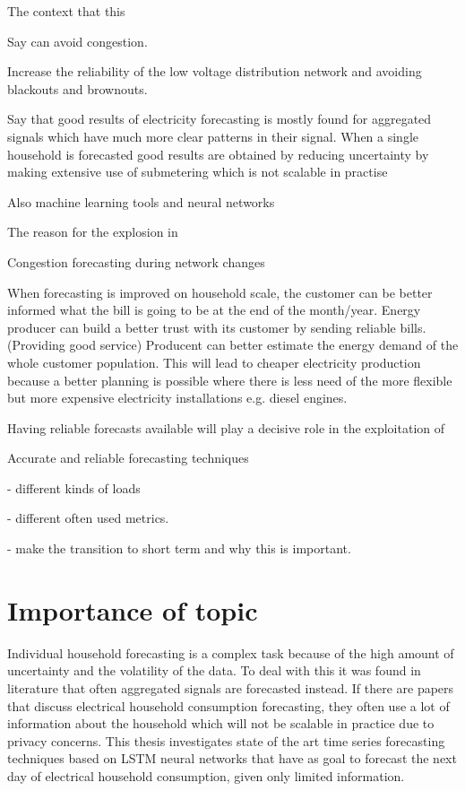 The context that this 


Say can avoid congestion. 

Increase the reliability of the low voltage distribution network and avoiding blackouts and brownouts. 


Say that good results of electricity forecasting is mostly found for aggregated signals which have much more clear patterns in their signal. When a single household is forecasted good results are obtained by reducing uncertainty by making extensive use of submetering which is not scalable in practise





Also machine learning tools and neural networks

The reason for the explosion in 


Congestion forecasting during network changes





When forecasting is improved on household scale, the customer can be better informed what the bill is going to be at the end of the month/year.
Energy producer can build a better trust with its customer by sending reliable bills. (Providing good service)
Producent can better estimate the energy demand of the whole customer population. This will lead to cheaper electricity production because a better planning is possible where there is less need of the more 
flexible but more expensive electricity installations e.g. diesel engines.



Having reliable forecasts available will play a decisive role in the exploitation of 


 Accurate and reliable forecasting techniques   


- different kinds of loads

- different often used metrics. 

- make the transition to short term and why this is important. 


\section{Importance of topic}
Individual household forecasting is a complex task because of the high amount of uncertainty
and the volatility of the data. To deal with this it was found in literature that often aggregated signals are forecasted instead. If there are papers that discuss electrical household consumption forecasting, they often use a lot of information about the household which will not be scalable in practice due to privacy concerns. This thesis investigates state of the art time series forecasting techniques based on LSTM neural networks that have as goal to forecast the next day of electrical household consumption, given only limited information.\\

